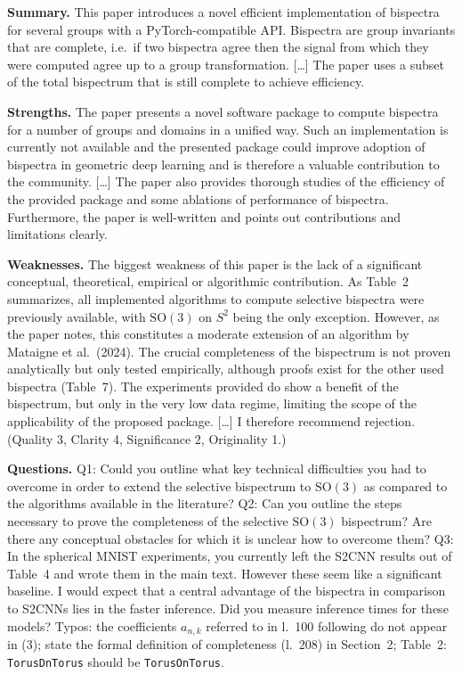 \documentclass[10pt]{article}
\newenvironment{reviewquote}%
  {\par\medskip\begingroup\color{reviewgray}\small%
   \list{}{\leftmargin=1.5em\rightmargin=1.5em}\item\relax}%
  {\endlist\endgroup\par\medskip}
\begin{document}
\begin{reviewquote}
\textbf{Summary.} This paper introduces a novel efficient implementation of
bispectra for several groups with a PyTorch-compatible API. Bispectra are
group invariants that are complete, i.e.\ if two bispectra agree then the
signal from which they were computed agree up to a group transformation.
[\ldots] The paper uses a subset of the total bispectrum that is still
complete to achieve efficiency.

\textbf{Strengths.} The paper presents a novel software package to compute
bispectra for a number of groups and domains in a unified way. Such an
implementation is currently not available and the presented package could
improve adoption of bispectra in geometric deep learning and is therefore a
valuable contribution to the community. [\ldots] The paper also provides
thorough studies of the efficiency of the provided package and some ablations
of performance of bispectra. Furthermore, the paper is well-written and
points out contributions and limitations clearly.

\textbf{Weaknesses.} The biggest weakness of this paper is the lack of a
significant conceptual, theoretical, empirical or algorithmic contribution.
As Table~2 summarizes, all implemented algorithms to compute selective
bispectra were previously available, with $\mathrm{SO}(3)$ on $S^2$ being the
only exception. However, as the paper notes, this constitutes a moderate
extension of an algorithm by Mataigne et al.\ (2024). The crucial
completeness of the bispectrum is not proven analytically but only tested
empirically, although proofs exist for the other used bispectra (Table~7).
The experiments provided do show a benefit of the bispectrum, but only in the
very low data regime, limiting the scope of the applicability of the proposed
package. [\ldots] I therefore recommend rejection.
(Quality 3, Clarity 4, Significance 2, Originality 1.)

\textbf{Questions.}
Q1: Could you outline what key technical difficulties you had to overcome in
order to extend the selective bispectrum to $\mathrm{SO}(3)$ as compared to
the algorithms available in the literature?
Q2: Can you outline the steps necessary to prove the completeness of the
selective $\mathrm{SO}(3)$ bispectrum? Are there any conceptual obstacles for
which it is unclear how to overcome them?
Q3: In the spherical MNIST experiments, you currently left the S2CNN results
out of Table~4 and wrote them in the main text. However these seem like a
significant baseline. I would expect that a central advantage of the
bispectra in comparison to S2CNNs lies in the faster inference. Did you
measure inference times for these models?
Typos: the coefficients $a_{n,k}$ referred to in l.~100 following do not
appear in (3); state the formal definition of completeness (l.~208) in
Section~2; Table~2: \texttt{TorusDnTorus} should be \texttt{TorusOnTorus}.
\end{reviewquote}
\end{document}

